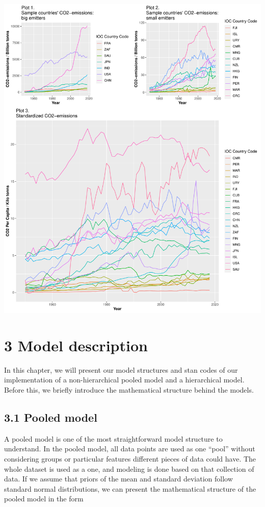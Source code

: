 \documentclass[
]{article}
\begin{document}
\begin{center}\includegraphics{project_files/figure-latex/fig1-1} \end{center}

\hypertarget{model-description}{%
\section{3 Model description}\label{model-description}}

In this chapter, we will present our model structures and stan codes of
our implementation of a non-hierarchical pooled model and a hierarchical
model. Before this, we briefly introduce the mathematical structure
behind the models.

\hypertarget{pooled-model}{%
\subsection{3.1 Pooled model}\label{pooled-model}}

A pooled model is one of the most straightforward model structure to
understand. In the pooled model, all data points are used as one
``pool'' without considering groups or particular features different
pieces of data could have. The whole dataset is used as a one, and
modeling is done based on that collection of data. If we assume that
priors of the mean and standard deviation follow standard normal
distributions, we can present the mathematical structure of the pooled
model in the form
\end{document}
